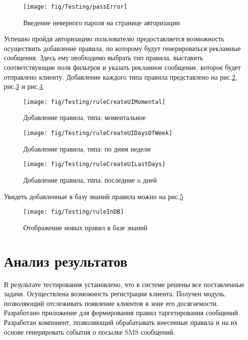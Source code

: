 \begin{figure}[h]
	\centering
	\texttt{[image: fig/Testing/passError]}
	\caption{Введение неверного пароля на странице авторизации}
	\label{fig:passError}
\end{figure}

Успешно пройдя авторизацию пользователю предоставляется возможность осуществить добавление правила, по которому будут генерироваться рекламные сообщения. Здесь ему необходимо выбрать тип правила, выставить соответствующие поля фильтров и указать рекламное сообщение, которое будет отправлено клиенту. Добавление каждого типа правила представлено на рис.\ref{fig:ruleCreateUIMomental}, рис.\ref{fig:ruleCreateUIDaysOfWeek} и рис.\ref{fig:ruleCreateUILastDays}.

\begin{figure}[h]
	\centering
	\texttt{[image: fig/Testing/ruleCreateUIMomental]}
	\caption{Добавление правила, типа: моментальное}
	\label{fig:ruleCreateUIMomental}
\end{figure}

\begin{figure}[h]
	\centering
	\texttt{[image: fig/Testing/ruleCreateUIDaysOfWeek]}
	\caption{Добавление правила, типа: по дням недели}
	\label{fig:ruleCreateUIDaysOfWeek}
\end{figure}

\begin{figure}[h]
	\centering
	\texttt{[image: fig/Testing/ruleCreateUILastDays]}
	\caption{Добавление правила, типа: последние n дней}
	\label{fig:ruleCreateUILastDays}
\end{figure}

Увидеть добавленные в базу знаний правила можно на рис.\ref{fig:ruleInDB}

\begin{figure}[h]
	\centering
	\texttt{[image: fig/Testing/ruleInDB]}
	\caption{Отображение новых правил в базе знаний}
	\label{fig:ruleInDB}
\end{figure}

\section{Анализ результатов}

В результате тестирования установлено, что в системе решены все поставленные задачи. Осуществлена возможность регистрации клиента. Получен модуль, позволяющий отслеживать появление клиентов в зоне его досягаемости. Разработано приложение для формирования правил таргетирования сообщений. Разработан компонент, позволяющий обрабатывать внесенные правила и на их основе генерировать события о посылке SMS сообщений.


